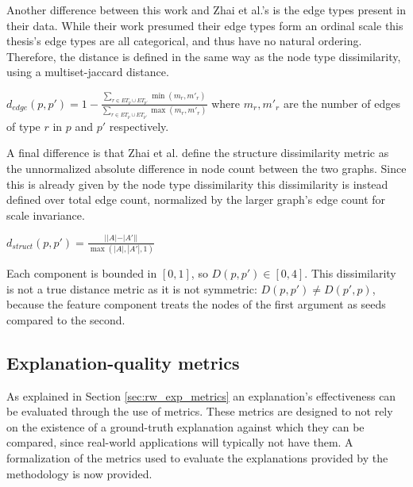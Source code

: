             Another difference between this work and Zhai et al.'s is the edge types present in their data. While their work presumed their edge types form an ordinal scale this thesis's edge types are all categorical, and thus have no natural ordering. Therefore, the distance is defined in the same way as the node type dissimilarity, using a multiset-jaccard distance.

            \begin{definition}
            \label{def:edge_dissim}
                $d_{edge}(p,p')=1-\frac{\sum_{r\in ET_p\cup ET_{p'}}\min(m_r,m'_r)}{\sum_{r\in ET_p\cup ET_{p'}}\max(m_r,m'_r)}$
                where $m_r, m'_r$ are the number of edges of type $r$ in $p$ and $p'$ respectively.
            \end{definition}
            
            A final difference is that Zhai et al. define the structure dissimilarity metric as the unnormalized absolute difference in node count between the two graphs. Since this is already given by the node type dissimilarity this dissimilarity is instead defined over total edge count, normalized by the larger graph's edge count for scale invariance.

            \begin{definition}
            \label{def:struct_dissim}
            $d_{struct}(p,p')=\frac{||A| - |A'||}{\max(|A|,|A'|,1)}$
            \end{definition}
            
            Each component is bounded in $[0,1]$, so $D(p,p')\in [0,4]$. This dissimilarity is not a true distance metric as it is not symmetric: $D(p,p')\neq D(p',p)$, because the feature component treats the nodes of the first argument as seeds compared to the second.

        \subsection{Explanation-quality metrics}
        \label{sec:dataset_metrics}
            As explained in Section \ref{sec:rw_exp_metrics} an explanation's effectiveness can be evaluated through the use of metrics. These metrics are designed to not rely on the existence of a ground-truth explanation against which they can be compared, since real-world applications will typically not have them. A formalization of the metrics used to evaluate the explanations provided by the methodology is now provided.

